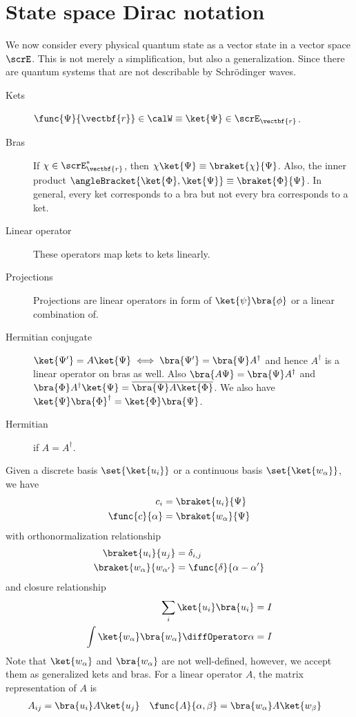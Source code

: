 \section{State space Dirac notation}
We now consider every physical quantum state as a vector state in a vector space \(\scrE\). This is not merely a simplification, but also a generalization. Since there are quantum systems that are not describable by Schr\"{o}dinger waves.
\begin{description}
    \item[Kets] \(\func{\Psi}{\vectbf{r}} \in \calW \equiv \ket{\Psi} \in \scrE_{\vectbf{r}}\).
    \item[Bras] If \(\chi \in \scrE_{\vectbf{r}}^{\ast}\), then \(\chi \ket{\Psi} \equiv \braket{\chi}{\Psi}\). Also, the inner product \(\angleBracket{\ket{\Phi},\ket{\Psi}} \equiv \braket{\Phi}{\Psi}\). In general, every ket corresponds to a bra but not every bra corresponds to a ket.
    \item[Linear operator] These operators map kets to kets linearly.
    \item[Projections] Projections are linear operators in form of \(\ket{\psi}\bra{\phi}\) or a linear combination of.
    \item[Hermitian conjugate] \(\ket{\Psi'} = A \ket{\Psi} \iff \bra{\Psi'} = \bra{\Psi} A^{\dagger}\) and hence \(A^{\dagger}\) is a linear operator on bras as well. Also \(\bra{A \Psi} = \bra{\Psi} A^{\dagger}\) and \(\bra{\Phi}A^{\dagger} \ket{\Psi} = \overline{\bra{\Psi} A \ket{\Phi}}\). We also have \(\ket{\Psi}\bra{\Phi}^{\dagger} = \ket{\Phi}\bra{\Psi} \). 
    \item[Hermitian] if \(A = A^{\dagger}\).
\end{description}
Given a discrete basis \(\set{\ket{u_i}}\) or a continuous basis \(\set{\ket{w_{\alpha}}}\), we have 
\begin{align*}
    c_i &= \braket{u_i}{\Psi}\\
    \func{c}{\alpha} &= \braket{w_{\alpha}}{\Psi}
\end{align*}
with orthonormalization relationship
\begin{align*}
    \braket{u_i}{u_j} &= \delta_{i,j}\\
    \braket{w_{\alpha}}{w_{\alpha'}} &= \func{\delta}{\alpha - \alpha'}
\end{align*}
and closure relationship
\begin{align*}
    \sum_i \ket{u_i} \bra{u_i} = I\\
    \int \ket{w_{\alpha}} \bra{w_{\alpha}} \diffOperator \alpha = I
\end{align*}
Note that \( \ket{w_{\alpha}}\) and \(\bra{w_{\alpha}}\) are not well-defined, however, we accept them as generalized kets and bras.
For a linear operator \(A\), the matrix representation of \(A\) is
\begin{align*}
    A_{ij} &= \bra{u_i}A \ket{u_j} &\func{A}{\alpha, \beta} &= \bra{w_{\alpha}} A \ket{w_{\beta}}
\end{align*}
